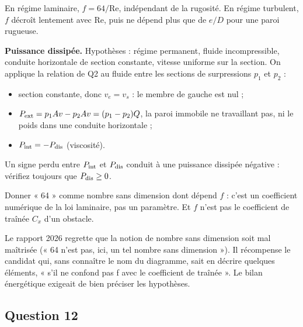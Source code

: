 \documentclass[11pt,a4paper]{article}
\providecommand{\tightlist}{\setlength{\itemsep}{0pt}\setlength{\parskip}{0pt}}
\newcommand{\equationajustee}[1]{%
  \sbox{\boiteequation}{$\displaystyle #1$}%
  \ifdim\wd\boiteequation>\linewidth
    \[\resizebox{\linewidth}{!}{\usebox{\boiteequation}}\]%
  \else
    \[#1\]%
  \fi}
\begin{document}
En régime laminaire, \(f=64/\mathrm{Re}\), indépendant de la rugosité. En régime turbulent, \(f\) décroît lentement avec \(\mathrm{Re}\), puis ne dépend plus que de \(e/D\) pour une paroi rugueuse.

\textbf{Puissance dissipée.} Hypothèses : régime permanent, fluide incompressible, conduite horizontale de section constante, vitesse uniforme sur la section. On applique la relation de Q2 au fluide entre les sections de surpressions \(p_1\) et \(p_2\) :

\begin{itemize}
\tightlist
\item
  section constante, donc \(v_e=v_s\) : le membre de gauche est nul ;
\item
  \(P_{\rm ext}=p_1Av-p_2Av=(p_1-p_2)Q\), la paroi immobile ne travaillant pas, ni le poids dans une conduite horizontale ;
\item
  \(P_{\rm int}=-P_{\rm dis}\) (viscosité).
\end{itemize}

\equationajustee{\boxed{P_{\rm dis}=Q\,(p_1-p_2)=\frac12\mu v^2\frac LDf\,Q}}

\begin{piege}

Un signe perdu entre \(P_{\rm int}\) et \(P_{\rm dis}\) conduit à une puissance dissipée négative : vérifiez toujours que \(P_{\rm dis}\ge0\).

\end{piege}

\begin{piege}

Donner « 64 » comme nombre sans dimension dont dépend \(f\) : c'est un coefficient numérique de la loi laminaire, pas un paramètre. Et \(f\) n'est pas le coefficient de traînée \(C_x\) d'un obstacle.

\end{piege}

\begin{jury}

Le rapport 2026 regrette que la notion de nombre sans dimension soit mal maîtrisée (« 64 n'est pas, ici, un tel nombre sans dimension »). Il récompense le candidat qui, sans connaître le nom du diagramme, sait en décrire quelques éléments, « s'il ne confond pas f avec le coefficient de traînée ». Le bilan énergétique exigeait de bien préciser les hypothèses.

\end{jury}

\hypertarget{question-12}{%
\subsection{Question 12}\label{question-12}}
\end{document}
